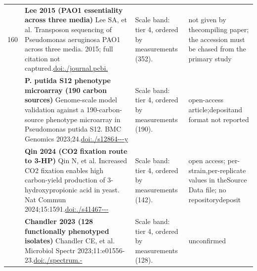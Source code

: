 \begin{landscape}
\begin{longtable}{@{}r@{\hspace{4pt}} L{78mm} L{72mm} L{76mm}@{}}
160 & \textbf{Lee 2015 (PAO1 essentiality across three media)} \newline Lee SA, et al. Transposon sequencing of Pseudomonas aeruginosa PAO1 across three media. 2015; full citation not captured.\newline \href{https://doi.org/10.1371/journal.pcbi.1013945}{doi:./\allowbreak journal\allowbreak .\allowbreak pcbi.} & Scale band: tier 4, ordered by measurements (352). & not give\allowbreak n by the\allowbreak  compili\allowbreak ng paper\allowbreak ; the ac\allowbreak cession \allowbreak must be \allowbreak chased f\allowbreak rom the \allowbreak primary \allowbreak study \\
 & \textbf{P. putida S12 phenotype microarray (190 carbon sources)} \newline Genome-scale model validation against a 190-carbon-source phenotype microarray in Pseudomonas putida S12. BMC Genomics 2023;24.\newline \href{https://doi.org/10.1186/s12864-023-09940-y}{doi:./\allowbreak s12864---\allowbreak y} & Scale band: tier 4, ordered by measurements (190). & open-\allowbreak access \allowbreak article;\allowbreak  deposit\allowbreak  and for\allowbreak mat not \allowbreak reported \\
 & \textbf{Qin 2024 (CO2 fixation route to 3-HP)} \newline Qin N, et al. Increased CO2 fixation enables high carbon-yield production of 3-hydroxypropionic acid in yeast. Nat Commun 2024;15:1591.\newline \href{https://doi.org/10.1038/s41467-024-45557-9}{doi:./\allowbreak s41467---} & Scale band: tier 4, ordered by measurements (142). & open acc\allowbreak ess; per\allowbreak -\allowbreak strain,\allowbreak  per-\allowbreak replica\allowbreak te value\allowbreak s in the\allowbreak  Source \allowbreak Data fil\allowbreak e; no re\allowbreak pository\allowbreak  deposit \\
 & \textbf{Chandler 2023 (128 functionally phenotyped isolates)} \newline Chandler CE, et al. Microbiol Spectr 2023;11:e01556-23.\newline \href{https://doi.org/10.1128/spectrum.01556-23}{doi:./\allowbreak spectru\allowbreak m.-} & Scale band: tier 4, ordered by measurements (128). & unconfir\allowbreak med \\

\end{longtable}
\end{landscape}
